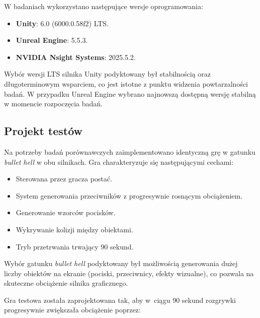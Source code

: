 \label{subsubsec:specyfikacja-oprogramowania}

W badaniach wykorzystano następujące wersje oprogramowania:

\begin{itemize}
    \item \textbf{Unity}: 6.0 (6000.0.58f2) LTS.
    \item \textbf{Unreal Engine}: 5.5.3.
    \item \textbf{NVIDIA Nsight Systems}: 2025.5.2.
\end{itemize}

Wybór wersji LTS silnika Unity podyktowany był stabilnością oraz długoterminowym wsparciem, 
co jest istotne z punktu widzenia powtarzalności badań. W przypadku Unreal Engine 
wybrano najnowszą dostępną wersję stabilną w momencie rozpoczęcia badań.

\subsection{Projekt testów}

\label{subsubsec:gra-testowa}

Na potrzeby badań porównawczych zaimplementowano identyczną grę w gatunku 
\emph{bullet hell} w obu silnikach. Gra charakteryzuje się następującymi cechami:

\begin{itemize}
    \item Sterowana przez gracza postać.
    \item System generowania przeciwników z progresywnie rosnącym obciążeniem.
    \item Generowanie wzorców pocisków.
    \item Wykrywanie kolizji między obiektami.
    \item Tryb przetrwania trwający 90 sekund.
\end{itemize}

Wybór gatunku \emph{bullet hell} podyktowany był możliwością generowania dużej 
liczby obiektów na ekranie (pociski, przeciwnicy, efekty wizualne), co 
pozwala na skuteczne obciążenie silnika graficznego.

\label{subsubsec:fazy-obciazenia}

Gra testowa została zaprojektowana tak, aby w~ciągu 90 sekund rozgrywki
progresywnie zwiększała obciążenie poprzez:

